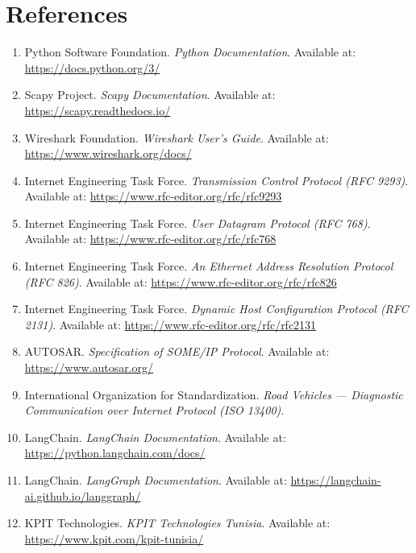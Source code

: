 \chapter*{References}

\begin{enumerate}

\item Python Software Foundation. \textit{Python Documentation}. Available at: \url{https://docs.python.org/3/}

\item Scapy Project. \textit{Scapy Documentation}. Available at: \url{https://scapy.readthedocs.io/}

\item Wireshark Foundation. \textit{Wireshark User's Guide}. Available at: \url{https://www.wireshark.org/docs/}

\item Internet Engineering Task Force. \textit{Transmission Control Protocol (RFC 9293)}. Available at: \url{https://www.rfc-editor.org/rfc/rfc9293}

\item Internet Engineering Task Force. \textit{User Datagram Protocol (RFC 768)}. Available at: \url{https://www.rfc-editor.org/rfc/rfc768}

\item Internet Engineering Task Force. \textit{An Ethernet Address Resolution Protocol (RFC 826)}. Available at: \url{https://www.rfc-editor.org/rfc/rfc826}

\item Internet Engineering Task Force. \textit{Dynamic Host Configuration Protocol (RFC 2131)}. Available at: \url{https://www.rfc-editor.org/rfc/rfc2131}

\item AUTOSAR. \textit{Specification of SOME/IP Protocol}. Available at: \url{https://www.autosar.org/}

\item International Organization for Standardization. \textit{Road Vehicles --- Diagnostic Communication over Internet Protocol (ISO 13400)}.

\item LangChain. \textit{LangChain Documentation}. Available at: \url{https://python.langchain.com/docs/}

\item LangChain. \textit{LangGraph Documentation}. Available at: \url{https://langchain-ai.github.io/langgraph/}

\item KPIT Technologies. \textit{KPIT Technologies Tunisia}. Available at: \url{https://www.kpit.com/kpit-tunisia/}

\end{enumerate}